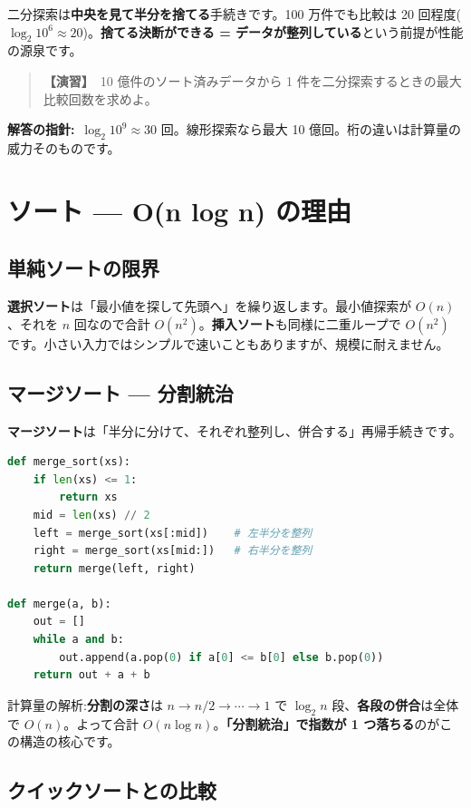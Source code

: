 \documentclass{article}
\begin{document}
二分探索は\textbf{中央を見て半分を捨てる}手続きです。100 万件でも比較は 20 回程度(\(\log_2 10^6 \approx 20\))。\textbf{捨てる決断ができる = データが整列している}という前提が性能の源泉です。

\begin{quote}
\textbf{【演習】}\ 10 億件のソート済みデータから 1 件を二分探索するときの最大比較回数を求めよ。
\end{quote}

\textbf{解答の指針:}\ \(\log_2 10^9 \approx 30\) 回。線形探索なら最大 10 億回。桁の違いは計算量の威力そのものです。

\section{ソート — O(n log n) の理由}

\subsection{単純ソートの限界}

\textbf{選択ソート}は「最小値を探して先頭へ」を繰り返します。最小値探索が \(O(n)\)、それを \(n\) 回なので合計 \(O(n^2)\)。\textbf{挿入ソート}も同様に二重ループで \(O(n^2)\) です。小さい入力ではシンプルで速いこともありますが、規模に耐えません。

\subsection{マージソート — 分割統治}

\textbf{マージソート}は「半分に分けて、それぞれ整列し、併合する」再帰手続きです。

\begin{lstlisting}[language=Python]
def merge_sort(xs):
    if len(xs) <= 1:
        return xs
    mid = len(xs) // 2
    left = merge_sort(xs[:mid])    # 左半分を整列
    right = merge_sort(xs[mid:])   # 右半分を整列
    return merge(left, right)

def merge(a, b):
    out = []
    while a and b:
        out.append(a.pop(0) if a[0] <= b[0] else b.pop(0))
    return out + a + b
\end{lstlisting}

計算量の解析:\textbf{分割の深さ}は \(n \to n/2 \to \cdots \to 1\) で \(\log_2 n\) 段、\textbf{各段の併合}は全体で \(O(n)\)。よって合計 \(O(n \log n)\)。\textbf{「分割統治」で指数が 1 つ落ちる}のがこの構造の核心です。

\subsection{クイックソートとの比較}
\end{document}
